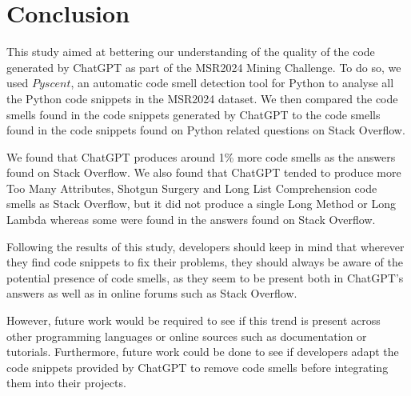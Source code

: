 
\section{Conclusion}
\label{sec:conclusion}
This study aimed at bettering our understanding of the quality of the code generated by ChatGPT as part of the MSR2024 Mining Challenge. To do so, we used $Pyscent$, an automatic code smell detection tool for Python to analyse all the Python code snippets in the MSR2024 dataset. We then compared the code smells found in the code snippets generated by ChatGPT to the code smells found in the code snippets found on Python related questions on Stack Overflow.

We found that ChatGPT produces around 1\% more code smells as the answers found on Stack Overflow. We also found that ChatGPT tended to produce more Too Many Attributes, Shotgun Surgery and Long List Comprehension code smells as Stack Overflow, but it did not produce a single Long Method or Long Lambda whereas some were found in the answers found on Stack Overflow.

Following the results of this study, developers should keep in mind that wherever they find code snippets to fix their problems, they should always be aware of the potential presence of code smells, as they seem to be present both in ChatGPT's answers as well as in online forums such as Stack Overflow.

However, future work would be required to see if this trend is present across other programming languages or online sources such as documentation or tutorials. Furthermore, future work could be done to see if developers adapt the code snippets provided by ChatGPT to remove code smells before integrating them into their projects. \\
